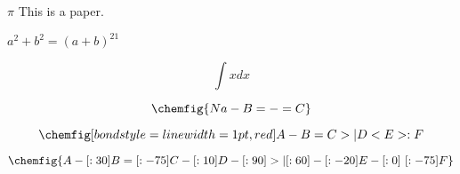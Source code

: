 \documentclass{article}
\begin{document}

$\pi$
This is a paper.

$a^2 + b^2 = (a+b)^{21}$


\[
\int x dx
\]

\begin{center}
\end{center}
\Huge
\[
\chemfig{Na-B=-=C}
\]

\[
\chemfig[bond style={line width=1pt,red}]{A-B=C>|D<E>:F}
\]

\[
\chemfig{A-[:30]B=[:-75]C-[:10]D-[:90]>|[:60]-[:-20]E-[:0]~[:-75]F}
\]
\end{document}
